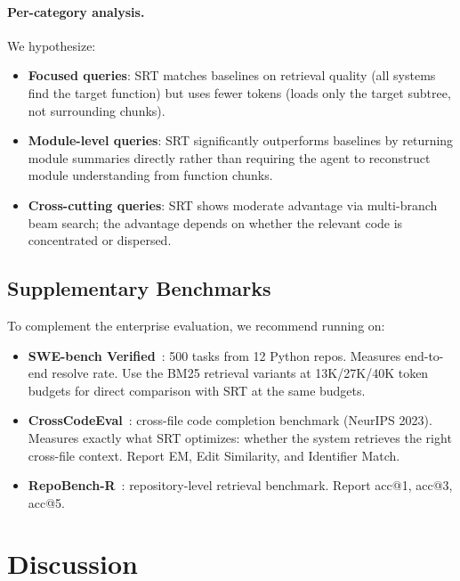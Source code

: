 \documentclass[11pt,a4paper]{article}
\newcommand{\srt}{\textsc{SRT}}
\begin{document}
\paragraph{Per-category analysis.}
We hypothesize:
\begin{itemize}[nosep]
    \item \textbf{Focused queries}: \srt{} matches baselines on retrieval quality (all systems find the target function) but uses fewer tokens (loads only the target subtree, not surrounding chunks).
    \item \textbf{Module-level queries}: \srt{} significantly outperforms baselines by returning module summaries directly rather than requiring the agent to reconstruct module understanding from function chunks.
    \item \textbf{Cross-cutting queries}: \srt{} shows moderate advantage via multi-branch beam search; the advantage depends on whether the relevant code is concentrated or dispersed.
\end{itemize}

\subsection{Supplementary Benchmarks}\label{sec:benchmarks}

To complement the enterprise evaluation, we recommend running on:
\begin{itemize}[nosep]
    \item \textbf{SWE-bench Verified}~\cite{swebench}: 500 tasks from 12 Python repos. Measures end-to-end resolve rate. Use the BM25 retrieval variants at 13K/27K/40K token budgets for direct comparison with \srt{} at the same budgets.
    \item \textbf{CrossCodeEval}~\cite{crosscodeeval}: cross-file code completion benchmark (NeurIPS 2023). Measures exactly what \srt{} optimizes: whether the system retrieves the right cross-file context. Report EM, Edit Similarity, and Identifier Match.
    \item \textbf{RepoBench-R}~\cite{repobench}: repository-level retrieval benchmark. Report acc@1, acc@3, acc@5.
\end{itemize}


\section{Discussion}\label{sec:discussion}
\end{document}
